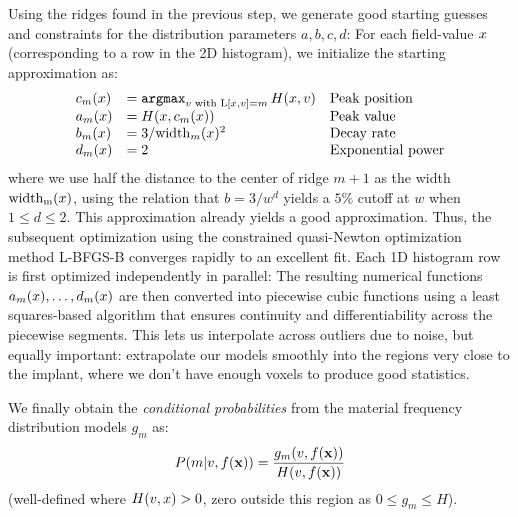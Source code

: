 Using the ridges found in the previous step, we generate good starting
guesses and constraints for the distribution parameters
$a,b,c,d$:
For each field-value $x$ (corresponding to a row in the 2D histogram),
we initialize the starting approximation as:
\begin{equation}
  \label{eq:starting-guesses}
  \begin{array}{lll}
    c_m(x) &= \mathop{\mathtt{argmax}}_{v \text{ with }\mathrm{L}[x,v] = m} H(x,v)  & \text{Peak position}  \\
    a_m(x) &= H(x,c_m(x)) & \text{Peak value}\\
    b_m(x) &= 3/\mathrm{width}_m(x)^2  & \text{Decay rate}\\
    d_m(x) &= 2 & \text{Exponential power}
  \end{array}
\end{equation}
where we use half the distance to the center of ridge $m+1$ as the width
$\mathrm{width_m}(x)$, using the relation that $b = 3/w^d$ yields
a $5\%$ cutoff at $w$ when $1\le d \le 2$. This approximation
already yields a good approximation. Thus, the subsequent
optimization using the constrained quasi-Newton optimization method L-BFGS-B\cite{BFGS}
converges rapidly to an excellent fit. Each 1D histogram row is first optimized
independently in parallel: The resulting numerical functions
$a_m(x),\ldots,d_m(x)$ are then converted into piecewise cubic
functions using a least squares-based algorithm that ensures continuity
and differentiability across the piecewise segments. This lets us interpolate across
outliers due to noise, but equally important:
extrapolate our models smoothly into the regions very close to the implant, where
we don't have enough voxels to produce good statistics.

We finally obtain the {\it conditional probabilities} from the material frequency distribution
models $g_m$ as:
\begin{equation}
  \label{eq:Pm}
  P(m|v,f(\mathbf{x})) = \frac{g_m(v,f(\mathbf{x}))}{H(v,f(\mathbf{x}))}
\end{equation}
(well-defined where $H(v,x) > 0$, zero outside this region as $0\le g_m \le H$).



